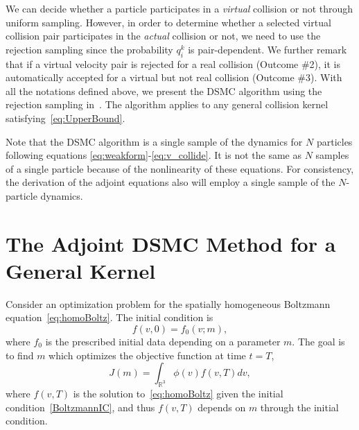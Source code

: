 \documentclass[12pt,nopreprintline]{elsarticle}
\newcommand{\bbR}{\mathbb R} \newcommand{\bbS}{\mathbb S}
\begin{document}
We can decide whether a particle participates in a \textit{virtual} collision or not through uniform sampling. However, in order to determine whether a selected virtual collision pair participates in the  \textit{actual} collision or not, we need to use the rejection sampling since the probability $q_i^k$ is pair-dependent. We further remark that if a virtual velocity pair is rejected for a real collision (Outcome \#2), it is automatically accepted for a virtual but not real collision (Outcome \#3). With all the notations defined above, we present the DSMC algorithm using the rejection sampling in~. The algorithm applies to any general collision kernel satisfying~\eqref{eq:UpperBound}. 

Note that the DSMC algorithm is a single sample of the dynamics for $N$ particles following equations \eqref{eq:weakform}-\eqref{eq:v_collide}. It is not the same as $N$ samples of a single particle because of the nonlinearity of these equations. For consistency, the derivation of the adjoint equations also will employ a single sample of the $N$-particle dynamics.








\section{The Adjoint DSMC Method for a General Kernel} \label{sec:adjoint DSMC}


Consider an optimization problem for the spatially homogeneous Boltzmann equation~\eqref{eq:homoBoltz}. 
The initial condition is
\begin{equation}
f(v,0)=f_0(v;m), \label{BoltzmannIC}
\end{equation}
where $f_0$ is the prescribed initial data depending on a parameter $m$. The goal is to find $m$ which optimizes the objective function at time $t=T$,
\begin{equation}\label{eq:OTD_obj}
J (m) = \int_{\bbR^3} \phi (v) f(v,T) dv,
\end{equation}
where $f(v,T)$ is the solution to~\eqref{eq:homoBoltz} given the initial condition~\eqref{BoltzmannIC}, and thus $f(v,T)$ depends on $m$ through the initial condition. 
\end{document}
